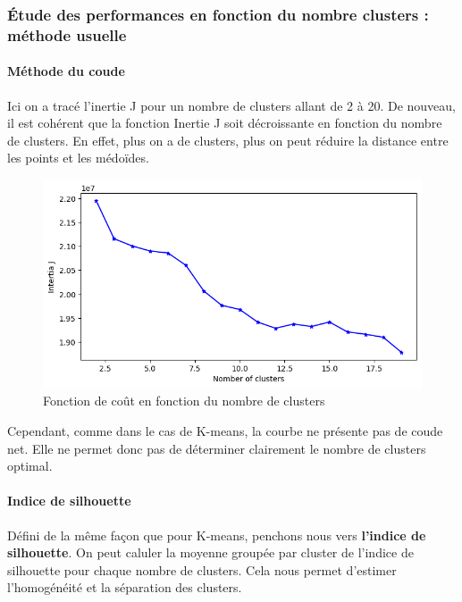 \documentclass[french,a4paper,18pt]{article}
\begin{document}
\subsubsection{Étude des performances en fonction du nombre clusters : méthode usuelle}

\paragraph{Méthode du coude}

Ici on a tracé l'inertie J pour un nombre de clusters allant de 2 à 20. De nouveau, il est cohérent que la fonction Inertie J 
soit décroissante en fonction du nombre de clusters. En effet, plus on a de clusters, plus on peut réduire la distance 
entre les points et les médoïdes. 

\begin{figure}[h!]
    \centering
    \includegraphics[scale=0.4]{images/mnist_kmedoids_inertia.png}
    \caption{Fonction de coût en fonction du nombre de clusters}\label{fig:mnist_kmedoids_cost}
\end{figure}

Cependant, comme dans le cas de K-means, la courbe ne présente pas de coude net.
Elle ne permet donc pas de déterminer clairement le nombre de clusters optimal.

\paragraph{Indice de silhouette}

Défini de la même façon que pour K-means, penchons nous vers \textbf{l'indice de silhouette}.
On peut caluler la moyenne groupée par cluster de l'indice de silhouette pour chaque nombre de clusters.
Cela nous permet d'estimer l'homogénéité et la séparation des clusters.
\end{document}
